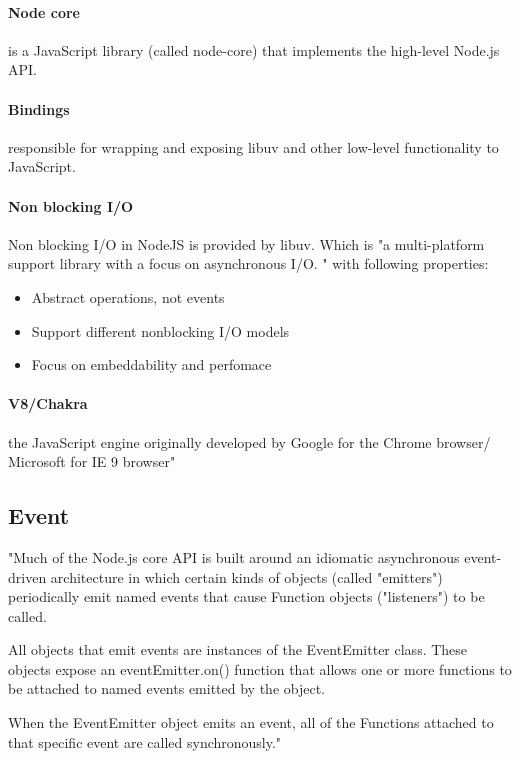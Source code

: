 \paragraph{Node core}
is a JavaScript library (called node-core) that implements the high-level Node.js API.

\paragraph{Bindings}
responsible for wrapping and exposing libuv and other low-level functionality to JavaScript.\cite{nodejsbook}

\paragraph{Non blocking I/O}
Non blocking I/O in NodeJS is provided by libuv\cite{nodejsabout}\cite{nodejsbook}. 
Which is "a multi-platform support library with a focus on asynchronous I/O. "\cite{libuv} with following properties\cite{libuvBasic}:
\begin{itemize}
\item Abstract operations, not events
\item Support different nonblocking I/O models
\item Focus on embeddability and perfomace
\end{itemize}

\paragraph{V8/Chakra} the JavaScript engine originally developed by Google for the Chrome browser/ Microsoft for IE 9 browser"\cite{nodejsbook} 

\subsection{Event}
"Much of the Node.js core API is built around an idiomatic asynchronous event-driven architecture in which certain kinds of objects (called "emitters") periodically emit named events that cause Function objects ("listeners") to be called.

All objects that emit events are instances of the EventEmitter class. These objects expose an eventEmitter.on() function that allows one or more functions to be attached to named events emitted by the object.

When the EventEmitter object emits an event, all of the Functions attached to that specific event are called synchronously."\cite{events}

